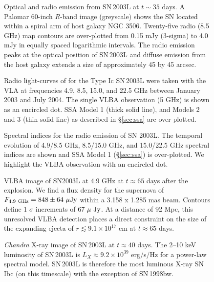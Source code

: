 \documentclass[12pt,preprint]{aastex}
\begin{document}
\clearpage

\begin{figure}
\caption{Optical and radio emission from SN\,2003L at $t\sim 35$ days.
A Palomar 60-inch $R$-band image (greyscale) shows the SN located 
within a spiral arm of host galaxy NGC 3506.  Twenty-five radio (8.5
GHz) map contours are over-plotted from 0.15 mJy (3-sigma) to 4.0 mJy
in equally spaced logarithmic intervals.  The radio emission peaks at the
optical position of SN\,2003L and diffuse emission from
the host galaxy extends a size of approximately 45 by 45 arcsec.
\label{fig:SN_contours}}
\end{figure}

\clearpage

\begin{figure}
\caption{Radio light-curves of for the Type Ic SN\,2003L were taken
  with the VLA at frequencies 4.9, 8.5, 15.0, and 22.5 GHz between
  January 2003 and July 2004.  The single VLBA observation (5 GHz) is
  shown as an encircled dot.  SSA Model 1 (thick solid line), and
  Models 2 and 3 (thin solid line) as described in \S\ref{sec:ssa}
  are over-plotted.  
\label{fig:lt_curves}}
\end{figure}

\clearpage

\begin{figure}
\caption{Spectral indices for the radio emission of SN 2003L.  The
temporal evolution of 4.9/8.5 GHz, 8.5/15.0 GHz, and 15.0/22.5 GHz
spectral indices are shown and SSA Model 1 (\S\ref{sec:ssa}) is
over-plotted.  We highlight the VLBA observation with an encircled
dot.
\label{fig:indices}}
\end{figure}

\clearpage

\begin{figure}
\caption{VLBA image of SN2003L at 4.9 GHz at $t\approx 65$ days after
the explosion.  We find a flux density for the supernova of
$F_{4.9\rm~GHz}=848 \pm 64~\mu\rm Jy$ within a 3.158 x 1.285 mas
beam. Contours define 1 $\sigma$ increments of $67~\mu\rm~Jy$. 
At a distance of 92 Mpc, this unresolved VLBA
detection places a direct constraint on the size of the expanding
ejecta of $r\lesssim 9.1\times 10^{17}$ cm at $t\approx 65$ days.
\label{fig:vlba}}
\end{figure}


\clearpage


\begin{figure}
\bigskip
\bigskip
\caption{{\it Chandra} X-ray image of SN\,2003L at $t\approx 40$ days.
The 2--10 keV luminosity of SN\,2003L is $L_X\approx 9.2\times
10^{39}$ erg/s/Hz for a power-law spectral model.  SN\,2003L is
therefore the most luminous X-ray SN Ibc (on this timescale) with the
exception of SN\,1998bw.
\label{fig:cxo}}
\end{figure}
\end{document}

